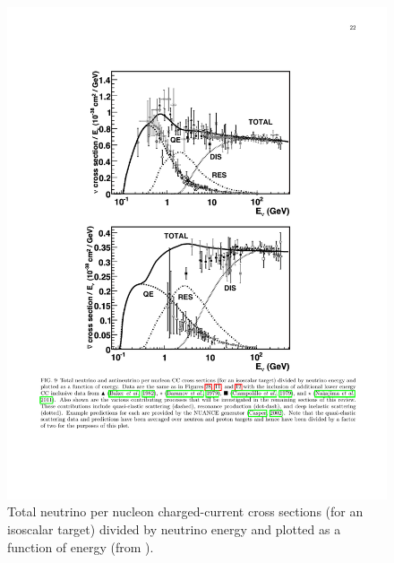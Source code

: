 \begin{figure}[htbp]
    \centering
    \includegraphics[width=0.7\linewidth]{figures/ccqecross.pdf}
    \caption{Total neutrino per nucleon charged-current cross sections (for an isoscalar target) divided by neutrino energy and plotted as a function of energy (from \cite{Formaggio:2013kya}).}
    \label{fig:ccqecross}
\end{figure}

